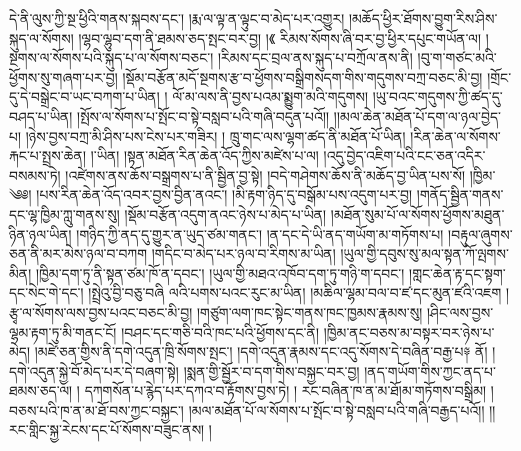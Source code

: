 དེ་ནི་ལུས་ཀྱི་སྔ་ཕྱིའི་གནས་སྐབས་དང་། །རྨ་ལ་ལྟ་ན་ལྟུང་བ་མེད་པར་འགྱུར། །མཆོད་ཕྱིར་ཐོགས་བྱུག་རིས་ཤིས་སྐུད་ལ་སོགས། །ལྷབ་ལྷུབ་དག་ནི་ཐམས་ཅད་སྤང་བར་བྱ། །《 རིམས་སོགས་ཞི་བར་བྱ་ཕྱིར་དཔུང་གཡོན་ལ། །སྔགས་ལ་སོགས་པའི་སྐུད་པ་ལ་སོགས་བཅང་། །རིམས་དང་བྲལ་ནས་སྐུད་པ་བཀྲོལ་ནས་ནི། །བུ་ག་གཙང་མའི་ཕྱོགས་སུ་གཞག་པར་བྱ། །སྡོམ་བརྩོན་མདོ་སྔགས་རྩ་བ་ཕྱོགས་བསྒྲིགསདག་གིས་གདུགས་བཀྲ་བཅང་མི་བྱ། །གྲོང་དུ་དེ་བསྒྲེང་བ་ཡང་བཀག་པ་ཡིན། ། ལོ་མ་ལས་ནི་བྱས་པའམ་སྨྱུག་མའི་གདུགས། །ཡུ་བའང་གདུགས་ཀྱི་ཚད་དུ་བཤད་པ་ཡིན། །སྤོས་ལ་སོགས་པ་སྤོང་བ་སྟེ་བསླབ་པའི་གཞི་བདུན་པའོ།། །།མལ་ཆེན་མཐོན་པོ་དག་ལ་ཉལ་བྱེད་པ། །ཉེས་བྱས་བཀྲ་མི་ཤིས་པས་ངེས་པར་གཟིར། ། ཁྲུ་གང་ལས་ལྷག་ཚད་ནི་མཐོན་པོ་ཡིན། །རིན་ཆེན་ལ་སོགས་རྐང་པ་སྤྲས་ཆེན། །་ཡིན། །སྟན་མཐོན་རིན་ཆེན་འོད་ཀྱིས་མཛེས་པ་ལ། །འདུ་བྱེད་འཇིག་པའི་ངང་ཅན་འདིར་བསམས་ཏེ། །འཛེགས་ནས་ཆོས་བསྒྲགས་པ་ནི་སྦྱིན་བྱ་སྟེ། །བདེ་གཤེགས་ཆོས་ནི་མཆོད་བྱ་ཡིན་པས་སོ། །ཁྱིམ་༄༅། །པས་རིན་ཆེན་འོད་འབར་བྱས་བྱིན་ནའང་། །མི་རྟག་ཉིད་དུ་བསྒོམ་པས་འདུག་པར་བྱ། །གནོད་སྦྱིན་གནས་དང་ལྷ་ཁྱིམ་ཀླུ་གནས་སུ། །སྡོམ་བརྩོན་འདུག་ནའང་ཉེས་པ་མེད་པ་ཡིན། །མཐོན་སུམ་པོ་ལ་སོགས་ཕྱོགས་མཐུན་ཉིན་ཉལ་ཡིན། །གཉིད་ཀྱི་ནད་དུ་གྱུར་ན་ཡུད་ཙམ་གནང་། །ན་དང་དེ་ཡི་ནད་གཡོག་མ་གཏོགས་པ། །བརྟུལ་ཞུགས་ཅན་ནི་མར་མེས་ཉལ་བ་བཀག །གདིང་བ་མེད་པར་ཉལ་བ་རིགས་མ་ཡིན། །ཡུལ་གྱི་དབུས་སུ་མལ་སྟན་ཀོ་ལྤགས་མིན། །ཁྱིམ་དག་ཏུ་ནི་སྟན་ཙམ་ཁོ་ན་དབང་། །ཡུལ་གྱི་མཐའ་འཁོབ་དག་ཏུ་གཉི་ག་དབང་། །གླང་ཆེན་རྟ་དང་སྟག་དང་སེང་གེ་དང་། །སྤྲེའུ་བྱི་བཅུ་བཞི ལའི་པགས་པའང་རུང་མ་ཡིན། །མཆིལ་ལྷམ་བལ་བ་ཛ་དང་མུན་ཛའི་འཇག །རྩྭ་ལ་སོགས་ལས་བྱས་པའང་བཅང་མི་བྱ། །གཙུག་ལག་ཁང་སྟེང་གནས་ཁང་ཁྱམས་རྣམས་སུ། །ཤིང་ལས་བྱས་ལྷམ་རྟག་ཏུ་མི་གནང་ངོ། །བཤང་དང་གཅི་བའི་ཁང་པའི་ཕྱོགས་དང་ནི། །ཁྱིམ་ནང་བཅས་མ་བསྟར་བར་ཉེས་པ་མེད། །མཛེ་ཅན་གྱིས་ནི་དགེ་འདུན་ཁྲི་སོགས་སྤང་། །དགེ་འདུན་རྣམས་དང་འདུ་སོགས་དེ་བཞིན་བརྒྱ་པ༈ ནོ། །དགེ་འདུན་སྐྱེ་བོ་མེད་པར་དེ་བཞག་སྟེ། །སྨན་གྱི་སྦྱོར་བ་དག་གིས་བསྐྱང་བར་བྱ། །ནད་གཡོག་གིས་ཀྱང་ནད་པ་ཐམས་ཅད་ལ། ། དཀགསོན་པ་རྙེད་པར་དཀའ་བ་རྟོགས་བྱས་ཏེ། ། རང་བཞིན་ཁ་ན་མ་ཐོ།མ་གཏོགས་བསྒྲིམ། །བཅས་པའི་ཁ་ན་མ་ཐོ་བས་ཀྱང་བསྐྱང་། །མལ་མཐོན་པོ་ལ་སོགས་པ་སྤོང་བ་སྟེ་བསླབ་པའི་གཞི་བརྒྱད་པའོ།། །།རང་གླིང་སྐྱ་རེངས་དང་པོ་སོགས་བཟུང་ནས། །
